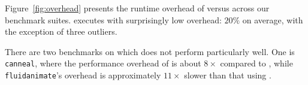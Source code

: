 Figure~\ref{fig:overhead} presents the runtime overhead of \sheriffdetect{} versus
\pthreads{} across our benchmark suites. \sheriffdetect{} executes with surprisingly
low overhead: $20\%$ on average, with the exception of three outliers.

There are two benchmarks on which \sheriffdetect{} does not perform
particularly well. One is \texttt{canneal}, where the performance overhead of \sheriffdetect{}
is about $8\times$ compared to \pthreads{}, while \texttt{fluidanimate}'s overhead is approximately
$11\times$ slower than that using \pthreads{}. 

